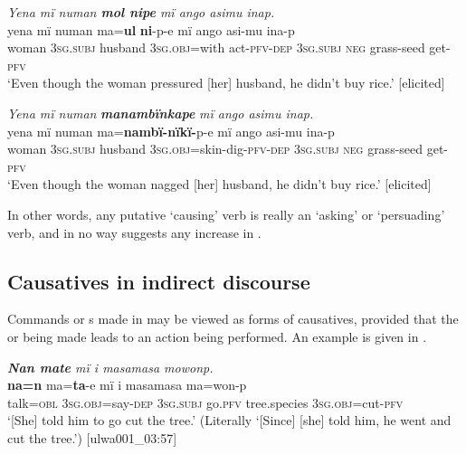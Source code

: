 \newpage

\ea%
    \label{ex:syntax:354}
          \textit{Yena mï numan \textbf{mol nipe} mï ango asimu inap.}\\
\gll    yena  mï      numan    ma=\textbf{ul}      \textbf{ni}{}-p-e      mï ango  asi-mu    ina-p\\
    woman  3\textsc{sg.subj}  husband  3\textsc{sg.obj}=with  act-\textsc{pfv-dep}  \textsc{3sg.subj}    \textsc{neg}  grass-seed  get-\textsc{pfv}\\
\glt `Even though the woman pressured [her] husband, he didn’t buy rice.’ [elicited]
\z

\ea%
    \label{ex:syntax:355}
          \textit{Yena mï numan} \textbf{\textit{manambïnkape}} \textit{mï ango asimu inap.}\\
\gll    yena  mï      numan    ma=\textbf{nambï-nïkï-}p-e      mï ango  asi-mu    ina-p\\
    woman  3\textsc{sg.subj}  husband  3\textsc{sg.obj}=skin-dig-\textsc{pfv-dep}  \textsc{3sg.subj}    \textsc{neg}  grass-seed  get-\textsc{pfv}\\
\glt `Even though the woman nagged [her] husband, he didn’t buy rice.’ [elicited]
\z

In other words, any putative ‘causing’ verb is really an ‘asking’ or ‘persuading’ verb, and in no way suggests any increase in .


\subsection{Causatives in indirect discourse}\label{sec:13.9.2}


Commands or s made in  may be viewed as forms of causatives, provided that the  or  being made leads to an action being performed. An example is given in .

\ea%
    \label{ex:syntax:358}
          \textit{\textbf{Nan mate} mï i masamasa mowonp.}\\
\gll    \textbf{na=n}    ma=\textbf{ta}{}-e      mï      i      masamasa ma=won-p\\
    talk=\textsc{obl}  3\textsc{sg.obj}=say-\textsc{dep}  \textsc{3sg.subj}  go.\textsc{pfv}    tree.species    3\textsc{sg.obj}=cut-\textsc{pfv}\\
\glt `[She] told him to go cut the tree.’ (Literally ‘[Since] [she] told him, he went and cut the tree.’) [ulwa001\_03:57]
\z

